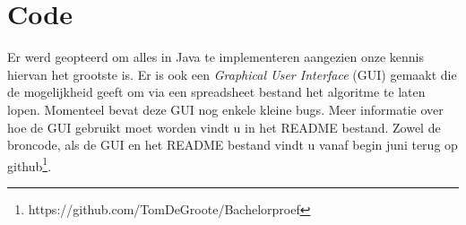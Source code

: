 \documentclass[Main.tex]{subfiles}
\begin{document}
\section{Code}
Er werd geopteerd om alles in Java te implementeren aangezien onze kennis hiervan het grootste is. Er is ook een \textit{Graphical User Interface} (GUI) gemaakt die de mogelijkheid geeft om via een spreadsheet bestand het algoritme te laten lopen. Momenteel bevat deze GUI nog enkele kleine bugs. Meer informatie over hoe de GUI gebruikt moet worden vindt u in het README bestand. Zowel de broncode, als de GUI en het README bestand vindt u vanaf begin juni terug op github\footnote{https://github.com/TomDeGroote/Bachelorproef}.
\end{document}
